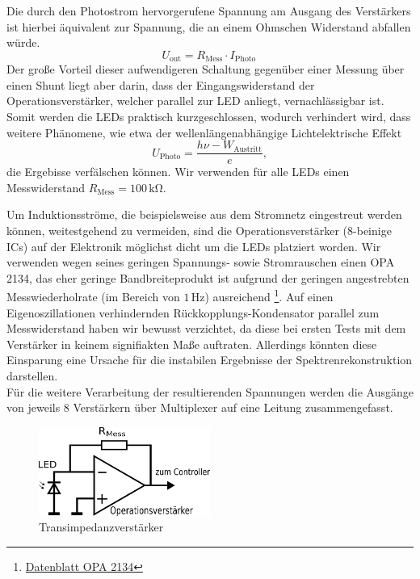 \documentclass[11pt]{scrartcl}
\newcommand{\unit}[1]{\ensuremath{\,\mathrm{#1}}} %
\begin{document}
Die durch den Photostrom hervorgerufene Spannung am Ausgang des Verstärkers ist hierbei äquivalent zur Spannung, die an einem Ohmschen Widerstand abfallen würde.
\begin{equation*}
U_{\text{out}} = R_{\text{Mess}} \cdot I_{\text{Photo}}\,
\end{equation*}
Der große Vorteil dieser aufwendigeren Schaltung gegenüber einer Messung über einen Shunt liegt aber darin, dass der Eingangswiderstand der Operationsverstärker, welcher parallel zur LED anliegt, vernachlässigbar ist. Somit werden die LEDs praktisch kurzgeschlossen, wodurch verhindert wird, dass weitere Phänomene, wie etwa der wellenlängenabhängige Lichtelektrische Effekt
\begin{equation*}
U_{\text{Photo}} = \frac {h \nu - W_{\text{Austritt}}} {e},
\end{equation*}
die Ergebisse verfälschen können. Wir verwenden für alle LEDs einen Messwiderstand $R_{\text{Mess}} = 100 \unit{k \Omega}$.

Um Induktionsströme, die beispielsweise aus dem Stromnetz eingestreut werden können, weitestgehend zu vermeiden, sind die Operationsverstärker (8-beinige ICs) auf der Elektronik möglichst dicht um die LEDs platziert worden. Wir verwenden wegen seines geringen Spannungs- sowie Stromrauschen einen OPA 2134, das eher geringe Bandbreiteprodukt ist aufgrund der geringen angestrebten Messwiederholrate (im Bereich von $1 \unit{Hz}$) ausreichend \footnote{\href{http://focus.ti.com/general/docs/lit/getliterature.tsp?genericPartNumber=opa2134&fileType=pdf}{Datenblatt OPA 2134}}. Auf einen Eigenoszillationen verhindernden Rückkopplungs-Kondensator parallel zum Messwiderstand haben wir bewusst verzichtet, da diese bei ersten Tests mit dem Verstärker in keinem signifiakten Maße auftraten. Allerdings könnten diese Einsparung eine Ursache für die instabilen Ergebnisse der Spektrenrekonstruktion darstellen. \\
Für die weitere Verarbeitung der resultierenden Spannungen werden die Ausgänge von jeweils 8 Verstärkern über Multiplexer auf eine Leitung zusammengefasst.


\begin{figure}[H]
\begin{center}
\includegraphics[width=0.5\textwidth]{transimp.png}
\end{center}
\vspace{-1.5\baselineskip}
\caption{Transimpedanzverstärker}
\label{fig:transimp}
\end{figure}
\end{document}
